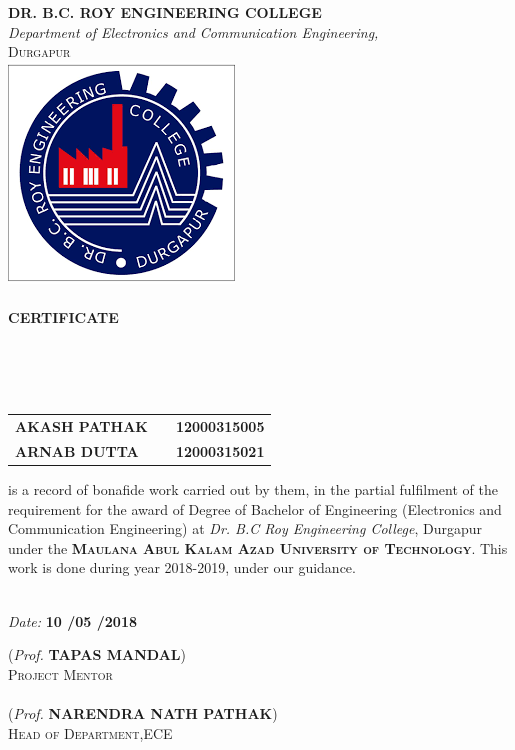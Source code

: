 \begin{center}
\thispagestyle{empty}

\LARGE{\textbf{DR. B.C. ROY ENGINEERING COLLEGE}} \\ 
\large{\emph{Department of Electronics and Communication Engineering,}}\\
\large{\textsc{Durgapur}}\\[0.5cm]

\includegraphics[scale=0.4]{project/images/download}\\[0.5cm]
{\Huge \textbf{\\CERTIFICATE}}\\[0.5cm]
\end{center}
\linespread{1.13}
\large{\\[0.2cm]
\textbf{\Large{}}\\[0.2cm]
\\[0.2cm]
\begin{table}[h]
\centering
\large{
\begin{tabular}{>{\bfseries}lc>{\bfseries}r}
AKASH PATHAK & & 12000315005\\ARNAB DUTTA & & 12000315021\\
\end{tabular}}
\end{table}
 is a record of bonafide work carried out by them, in the partial
 fulfilment of the requirement for the award of Degree of Bachelor of
 Engineering (Electronics and Communication Engineering) at \emph{Dr. B.C Roy Engineering College}, Durgapur under the 
 \textsc{\textbf{Maulana Abul Kalam Azad University of Technology}}. This work is done
 during year 2018-2019, under our guidance.}\\[0.5cm]
\large{\emph{Date:}\textbf{ 10 /05 /2018}}\\
\begin{spacing}{0}
\vspace{2.0cm}
\hspace*{3.5in}\large{(\emph{Prof.}\textbf{ TAPAS MANDAL})}\\
\hspace*{3.9in}\textsc{Project Mentor}\\
\vspace{3.0cm}\\
\hspace*{3.9in}\large{(\emph{Prof.}\textbf{ NARENDRA NATH PATHAK})}\\
\hspace*{3.9in}\textsc{Head of Department,ECE}\\
\end{spacing}